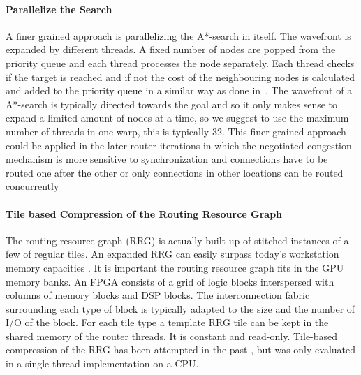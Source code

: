 \documentclass[a4paper,oneside,12pt]{article}
\begin{document}
\paragraph{Parallelize the Search}
A finer grained approach is parallelizing the A*-search in itself. The wavefront is expanded by different threads. A fixed number of nodes are popped from the priority queue and each thread processes the node separately. Each thread checks if the target is reached and if not the cost of the neighbouring nodes is calculated and added to the priority queue in a similar way as done in~\cite{Merrill2015}. The wavefront of a A*-search is typically directed towards the goal and so it only makes sense to expand a limited amount of nodes at a time, so we suggest to use the maximum number of threads in one warp, this is typically 32. This finer grained approach could be applied in the later router iterations in which the negotiated congestion mechanism is more sensitive to synchronization and connections have to be routed one after the other or only connections in other locations can be routed concurrently~\cite{gort2010deterministic}

\paragraph{Tile based Compression of the Routing Resource Graph}
The routing resource graph (RRG) is actually built up of stitched instances of a few of regular tiles. An expanded RRG can easily surpass today's workstation memory capacities \cite{murray2015timing}. It is important the routing resource graph fits in the GPU memory banks.
An FPGA consists of a grid of logic blocks interspersed with columns of memory blocks and DSP blocks. The interconnection fabric surrounding each type of block is typically adapted to the size and the number of I/O of the block. For each tile type a template RRG tile can be kept in the shared memory of the router threads. It is constant and read-only.
Tile-based compression of the RRG has been attempted in the past \cite{chin2007memory}, but was only evaluated in a single thread implementation on a CPU.

\end{document}
